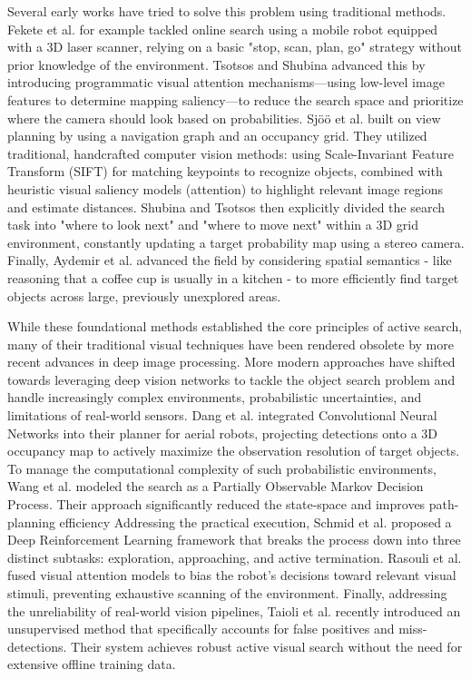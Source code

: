 \documentclass[
	parspace, %
	noindent, %
	final, %
]{elteikthesis}
\begin{document}
Several early works have tried to solve this problem using traditional methods. Fekete et al. \cite{online_fekete_2006} for example tackled online search using a mobile robot equipped with a 3D laser scanner, relying on a basic "stop, scan, plan, go" strategy without prior knowledge of the environment. Tsotsos and Shubina \cite{attention_tsotsos_2007} advanced this by introducing programmatic visual attention mechanisms—using low-level image features to determine mapping saliency—to reduce the search space and prioritize where the camera should look based on probabilities. Sjöö et al. \cite{object_sj_2009} built on view planning by using a navigation graph and an occupancy grid. They utilized traditional, handcrafted computer vision methods: using Scale-Invariant Feature Transform (SIFT) for matching keypoints to recognize objects, combined with heuristic visual saliency models (attention) to highlight relevant image regions and estimate distances. Shubina and Tsotsos \cite{visual_shubina_2010} then explicitly divided the search task into "where to look next" and "where to move next" within a 3D grid environment, constantly updating a target probability map using a stereo camera. Finally, Aydemir et al. \cite{active_aydemir_2013} advanced the field by considering spatial semantics - like reasoning that a coffee cup is usually in a kitchen - to more efficiently find target objects across large, previously unexplored areas.


While these foundational methods established the core principles of active search, many of their traditional visual techniques have been rendered obsolete by more recent advances in deep image processing. More modern approaches have shifted towards leveraging deep vision networks to tackle the object search problem and handle increasingly complex environments, probabilistic uncertainties, and limitations of real-world sensors. 
Dang et al. \cite{autonomous_dang_2018} integrated Convolutional Neural Networks into their planner for aerial robots, projecting detections onto a 3D occupancy map to actively maximize the observation resolution of target objects. To manage the computational complexity of such probabilistic environments, Wang et al. \cite{efficient_wang_2018} modeled the search as a Partially Observable Markov Decision Process. Their approach significantly reduced the state-space and improves path-planning efficiency Addressing the practical execution, Schmid et al. \cite{explore_schmid_2019} proposed a Deep Reinforcement Learning framework that breaks the process down into three distinct subtasks: exploration, approaching, and active termination. Rasouli et al. fused visual attention models to bias the robot's decisions toward relevant visual stimuli, preventing exhaustive scanning of the environment. Finally, addressing the unreliability of real-world vision pipelines, Taioli et al. \cite{unsupervised_taioli_2023} recently introduced an unsupervised method that specifically accounts for false positives and miss-detections. Their system achieves robust active visual search without the need for extensive offline training data.
\end{document}
